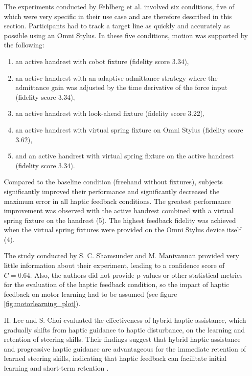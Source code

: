 The experiments conducted by Fehlberg et al. involved six conditions, five of which were very specific in their use case and are therefore described in this section. Participants had to track a target line as quickly and accurately as possible using an Omni Stylus. In these five conditions, motion was supported by the following:
\begin{enumerate}
    \item an active handrest with cobot fixture (fidelity score 3.34),
    \item an active handrest with an adaptive admittance strategy where the admittance gain was adjusted by the time derivative of the force input (fidelity score 3.34),
    \item an active handrest with look-ahead fixture (fidelity score 3.22),
    \item an active handrest with virtual spring fixture on Omni Stylus (fidelity score 3.62),
    \item and an active handrest with virtual spring fixture on the active handrest (fidelity score 3.34).
\end{enumerate}
Compared to the baseline condition (freehand without fixtures), subjects significantly improved their performance and significantly decreased the maximum error in all haptic feedback conditions. The greatest performance improvement was observed with the active handrest combined with a virtual spring fixture on the handrest (5). The highest feedback fidelity was achieved when the virtual spring fixtures were provided on the Omni Stylus device itself (4). 

The study conducted by S. C. Shamsunder and M. Manivannan provided very little information about their experiment, leading to a confidence score of $C = 0.64$. Also, the authors did not provide p-values or other statistical metrics for the evaluation of the haptic feedback condition, so the impact of haptic feedback on motor learning had to be assumed (see figure \ref{fig:motorlearning_plot}).

H. Lee and S. Choi evaluated the effectiveness of hybrid haptic assistance, which gradually shifts from haptic guidance to haptic disturbance, on the learning and retention of steering skills. Their findings suggest that hybrid haptic assistance and progressive haptic guidance are advantageous for the immediate retention of learned steering skills, indicating that haptic feedback can facilitate initial learning and short-term retention \cite{LeeH2014}. 

